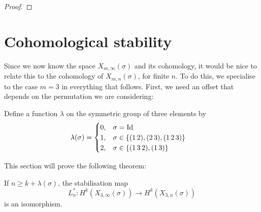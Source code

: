 \begin{proof}
  
\end{proof}


\section{Cohomological stability}
\label{sec:costa}
Since we now know the space $X_{m,\infty}(\sigma)$ and its cohomology, it
would be nice to relate this to the cohomology of
$X_{m,n}(\sigma)$, for finite $n$. To do this, we specialise to the
case $m = 3$ in
everything that
follows. First, we need an offset that depends on the permutation
we are considering:
\begin{definition}
  Define a function $\lambda$ on the symmetric group of three elements
  by
  \begin{align*}
    \lambda(\sigma) &=
                      \begin{cases}
                        0, & \sigma = \operatorname{Id} \\
                        1, & \sigma \in \left\{ (1\,2),(2\,3),(1\,2\,3) \right\}
                        \\
                        2, & \sigma \in \left\{ (1\,3\,2), (1\,3) \right\}
                      \end{cases}
  \end{align*}
\end{definition}

This section will prove the following theorem:
\begin{theorem}
  \label{thm:kostab}
  If $n \geq k + \lambda(\sigma)$, the stabilisation map
  \[ L_{n}^* : H^k(X_{3,\infty}(\sigma)) \to H^k(X_{3,n}(\sigma)) \]
  is an isomorphism.
\end{theorem}

